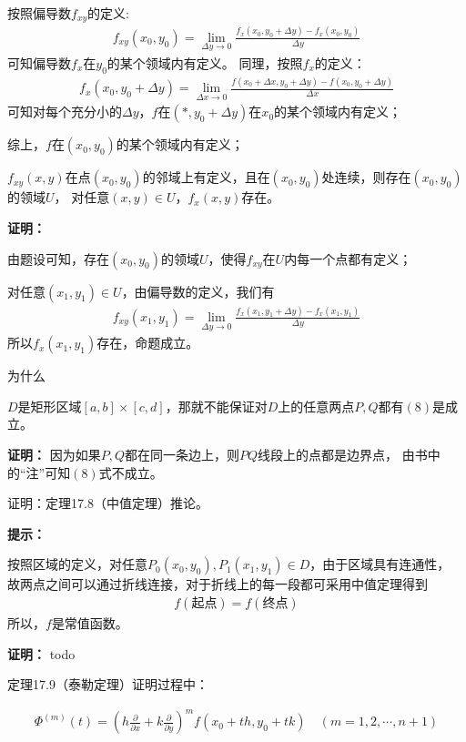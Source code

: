 \documentclass{article}
\begin{document}
按照偏导数$f_{xy}$的定义:
\begin{align*}
  f_{xy}(x_0, y_0) = \lim\limits_{\Delta y \to 0} \frac{f_x(x_0, y_0 + \Delta y) - f_x(x_0, y_0)}{\Delta y}
\end{align*}
可知偏导数$f_x$在$y_0$的某个领域内有定义。
同理，按照$f_x$的定义：
\begin{align*}
  f_x(x_0, y_0 + \Delta y) = \lim\limits_{\Delta x \to 0} \frac{f(x_0 + \Delta x, y_0 + \Delta y) - f(x_0, y_0 + \Delta y)}{\Delta x}
\end{align*}
可知对每个充分小的$\Delta y$，$f$在$(*, y_0 + \Delta y)$在$x_0$的某个领域内有定义；

综上，$f$在$(x_0, y_0)$的某个领域内有定义；

\begin{zremark}
  $f_{xy}(x, y)$在点$(x_0, y_0)$的邻域上有定义，且在$(x_0, y_0)$处连续，则存在$(x_0, y_0)$的领域$U$，
  对任意$(x, y) \in U$，$f_x(x, y)$存在。
\end{zremark}
\textbf{证明：}

由题设可知，存在$(x_0, y_0)$的领域$U$，使得$f_{xy}$在$U$内每一个点都有定义；

对任意$(x_1, y_1) \in U$，由偏导数的定义，我们有
\begin{align*}
  f_{xy} (x_1, y_1) = \lim\limits_{\Delta y \to 0} \frac{f_x(x_1, y_1 + \Delta y) - f_x(x_1, y_1)}{\Delta y}
\end{align*}
所以$f_x(x_1, y_1)$存在，命题成立。

\begin{zremark}
  为什么

  $D$是矩形区域$[a, b] \times [c, d]$，那就不能保证对$D$上的任意两点$P,Q$都有$(8)$是成立。
\end{zremark}
\textbf{证明：}
因为如果$P,Q$都在同一条边上，则$PQ$线段上的点都是边界点，
由书中的“注”可知$(8)$式不成立。

\begin{zremark}
  证明：定理17.8（中值定理）推论。
\end{zremark}

\textbf{提示：}

按照区域的定义，对任意$P_0(x_0, y_0), P_1(x_1, y_1) \in D$，由于区域具有连通性，
故两点之间可以通过折线连接，对于折线上的每一段都可采用中值定理得到
\begin{align*}
  f(\textbf{起点}) = f(\textbf{终点})
\end{align*}
所以，$f$是常值函数。

\textbf{证明：}
todo


\begin{zremark}
  定理17.9（泰勒定理）证明过程中：

  \begin{align*}
    \varPhi^{(m)}(t) = \left( h\frac{\partial}{\partial x} + k\frac{\partial}{\partial y} \right)^m
    f(x_0 + th, y_0 + tk) \quad (m = 1, 2, \cdots, n + 1)
  \end{align*}
\end{zremark}
\end{document}
